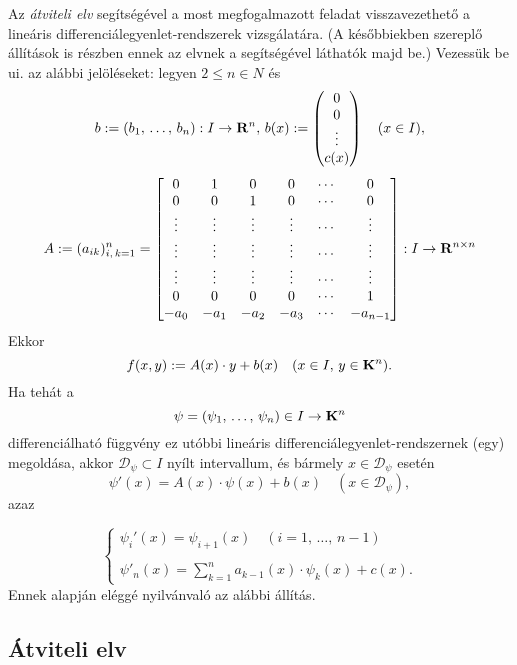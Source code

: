 Az \textit{átviteli elv} segítségével a most megfogalmazott feladat visszavezethető a lineáris differenciálegyenlet-rendszerek vizsgálatára. (A későbbiekben szereplő állítások is részben ennek az elvnek a segítségével láthatók majd be.) Vezessük be ui. az alábbi jelöléseket: legyen $2 \leq n \in N$ és
\[
	b := (b_1, \, \dots, \, b_n) : I \to \mathbf{R}^n, \, b(x) := \begin{pmatrix}
		0 \\
		0 \\
		\vdots \\
		c(x)
	\end{pmatrix} \quad (x \in I),
\]
\[
	A := (a_{ik})_{i, \, k = 1}^n = \begin{bmatrix}
		0 & 1 & 0 & 0 & \cdots & 0 \\
		0 & 0 & 1 & 0 & \cdots & 0 \\
		\vdots & \vdots & \vdots & \vdots & \cdots & \vdots \\
		\vdots & \vdots & \vdots & \vdots & \cdots & \vdots \\
		\vdots & \vdots & \vdots & \vdots & \cdots & \vdots \\
		0 & 0 & 0 & 0 & \cdots & 1 \\
		-a_0 & -a_1 & -a_2 & -a_3 & \cdots & -a_{n-1}
	\end{bmatrix} : I \to \mathbf{R}^{n \times n}
\]
Ekkor
\[
	f(x, y) := A(x) \cdot y + b(x) \quad (x \in I, \, y \in \mathbf{K}^n).
\]
Ha tehát a
\[
	\psi = (\psi_1, \, \dots, \, \psi_n) \in I \to \mathbf{K}^n
\]
differenciálható függvény ez utóbbi lineáris differenciálegyenlet-rendszernek (egy) megoldása, akkor $\mathcal{D}_\psi \subset I$ nyílt intervallum, és bármely $x \in \mathcal{D}_\psi$ esetén
\[
	\psi'(x) = A(x) \cdot \psi(x) + b(x) \quad (x \in \mathcal{D}_\psi),
\]
azaz

\begin{equation}\label{eqn:einstein}
	\begin{cases}
		\psi_i'(x) = \psi_{i+1}(x) \quad (i = 1, \, \dots, \, n-1)\\
		\\
		\displaystyle \psi'_n(x) = \sum_{k=1}^n a_{k-1}(x) \cdot \psi_k(x) + c(x).
	\end{cases}
	\tag{$\star$}
\end{equation}
Ennek alapján eléggé nyilvánvaló az alábbi állítás.\\

\subsection{Átviteli elv}

